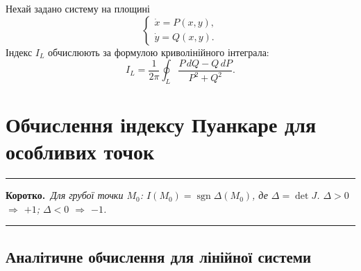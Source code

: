 \documentclass[12pt,a4paper]{article}
\DeclareMathOperator{\sgn}{sgn}
\newenvironment{korotko}
  {\par\medskip\noindent\begingroup\color{accent!75!black}\rule{\linewidth}{0.4pt}\par
   \noindent\textbf{Коротко.}\itshape\,}
  {\par\noindent\rule{\linewidth}{0.4pt}\endgroup\medskip}
\begin{document}
Нехай задано систему на площині
\begin{equation}\label{eq:poincare-system}
\begin{cases}
  \dot{x} = P(x,y),\\
  \dot{y} = Q(x,y).
\end{cases}
\end{equation}
Індекс $I_L$ обчислюють за формулою криволінійного інтеграла:
\begin{equation}\label{eq:poincare-integral}
  I_L = \frac{1}{2\pi}\oint_L
  \frac{P\,dQ - Q\,dP}{P^2 + Q^2}.
\end{equation}

\section{Обчислення індексу Пуанкаре для особливих точок}

\begin{korotko}
Для грубої точки $M_0$: $I(M_0)=\sgn\Delta(M_0)$, де $\Delta=\det J$.
$\Delta>0$ $\Rightarrow$ $+1$; $\Delta<0$ $\Rightarrow$ $-1$.
\end{korotko}

\subsection{Аналітичне обчислення для лінійної системи}
\end{document}
